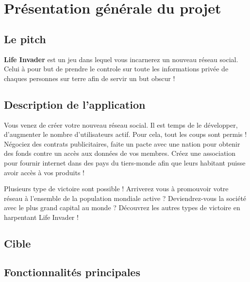 \chapter{Présentation générale du projet}
\label{chap:premierchapitre}

\section{Le pitch}
\textbf{Life Invader} est un jeu dans lequel vous incarnerez un nouveau réseau social. Celui à pour but de prendre le controle sur toute les informations privée de chaques personnes sur terre afin de servir un but obscur !

\section{Description de l'application}

Vous venez de créer votre nouveau réseau social. Il est temps de le développer, d'augmenter le nombre d'utilisateurs actif. Pour cela, tout les coups sont permis ! Négociez des contrats publicitaires, faite un pacte avec une nation pour obtenir des fonds contre un accès aux données de vos membres. Créez une association pour fournir internet dans des pays du tiers-monde afin que leurs habitant puisse avoir accès à vos produits !

Plusieurs type de victoire sont possible ! Arriverez vous à promouvoir votre réseau à l'ensemble de la population mondiale active ? Deviendrez-vous la société avec le plus grand capital au monde ? Découvrez les autres types de victoire en harpentant Life Invader !

\section{Cible}


\section{Fonctionnalités principales}

